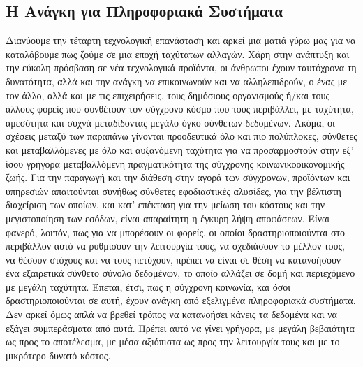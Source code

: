 \documentclass{article}
\begin{document}
\subsection{Η Ανάγκη για Πληροφοριακά Συστήματα}
Διανύουμε την τέταρτη τεχνολογική επανάσταση και αρκεί μια ματιά γύρω μας
για να καταλάβουμε πως ζούμε σε μια εποχή ταχύτατων αλλαγών. Χάρη στην
ανάπτυξη και την εύκολη πρόσβαση σε νέα τεχνολογικά προϊόντα, οι άνθρωποι
έχουν ταυτόχρονα τη δυνατότητα, αλλά και την ανάγκη να επικοινωνούν και να
αλληλεπιδρούν, ο ένας με τον άλλο, αλλά και με τις επιχειρήσεις, τους
δημόσιους οργανισμούς ή/και τους άλλους φορείς που συνθέτουν τον σύγχρονο
κόσμο που τους περιβάλλει, με ταχύτητα, αμεσότητα και συχνά μεταδίδοντας
μεγάλο όγκο σύνθετων δεδομένων. Ακόμα, οι σχέσεις μεταξύ των παραπάνω
γίνονται προοδευτικά όλο και πιο πολύπλοκες, σύνθετες και μεταβαλλόμενες
με όλο και αυξανόμενη ταχύτητα για να προσαρμοστούν στην εξ’ ίσου γρήγορα
μεταβαλλόμενη πραγματικότητα της σύγχρονης κοινωνικοοικονομικής ζωής. Για
την παραγωγή και την διάθεση στην αγορά των σύγχρονων, προϊόντων και
υπηρεσιών απαιτούνται συνήθως σύνθετες εφοδιαστικές αλυσίδες, για την
βέλτιστη διαχείριση των οποίων, και κατ’ επέκταση για την μείωση του
κόστους και την μεγιστοποίηση των εσόδων, είναι απαραίτητη η έγκυρη λήψη
αποφάσεων. Είναι φανερό, λοιπόν, πως για να μπορέσουν οι φορείς, οι οποίοι
δραστηριοποιούνται στο περιβάλλον αυτό να ρυθμίσουν την λειτουργία τους,
να σχεδιάσουν το μέλλον τους, να θέσουν στόχους και να τους πετύχουν,
πρέπει να  είναι σε θέση να κατανοήσουν ένα εξαιρετικά σύνθετο σύνολο
δεδομένων, το οποίο αλλάζει σε δομή και περιεχόμενο με μεγάλη ταχύτητα.
Έπεται, έτσι, πως η σύγχρονη κοινωνία, και όσοι δραστηριοποιούνται σε
αυτή, έχουν ανάγκη από εξελιγμένα πληροφοριακά συστήματα.
Δεν αρκεί όμως απλά  να βρεθεί τρόπος να κατανοήσει κάνεις τα δεδομένα και
να εξάγει συμπεράσματα από αυτά. Πρέπει αυτό να γίνει γρήγορα, με μεγάλη
βεβαιότητα ως προς το αποτέλεσμα, με μέσα αξιόπιστα ως προς την λειτουργία
τους και με το μικρότερο δυνατό κόστος.
\end{document}
